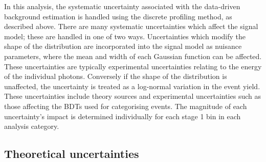 In this analysis, the systematic uncertainty associated with the data-driven background estimation 
is handled using the discrete profiling method, as described above.
There are many systematic uncertainties which affect the signal model; 
these are handled in one of two ways.
Uncertainties which modify the shape of the \mgg distribution are incorporated into the signal model
as nuisance parameters, where the mean and width of each Gaussian function can be affected.
These uncertainties are typically experimental uncertainties 
relating to the energy of the individual photons. 
Conversely if the shape of the \mgg distribution is unaffected, 
the uncertainty is treated as a log-normal variation in the event yield.
These uncertainties include theory sources
and experimental uncertainties such as those affecting the BDTs used for categorising events.
The magnitude of each uncertainty's impact is determined individually 
for each stage 1 bin in each analysis category.

\subsection{Theoretical uncertainties}

